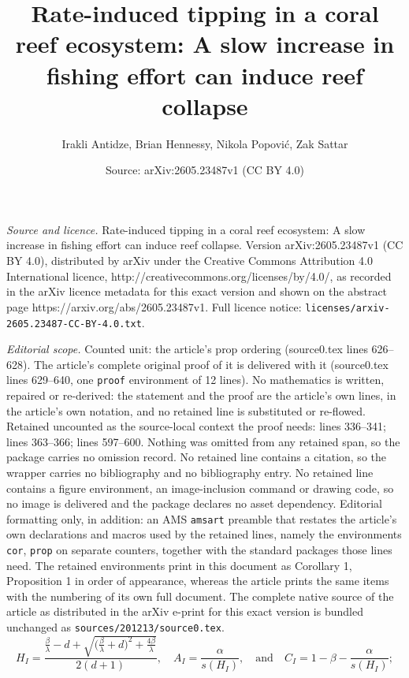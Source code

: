 \documentclass[10pt,a4paper]{amsart}
\title{Rate-induced tipping in a coral reef ecosystem: A slow increase in fishing effort can induce reef collapse}
\author{Irakli Antidze, Brian Hennessy, Nikola Popovi\'c, Zak Sattar}
\date{Source: arXiv:2605.23487v1 (CC BY 4.0)}
\begin{document}
\maketitle

\noindent\emph{Source and licence.} Rate-induced tipping in a coral reef ecosystem: A slow increase in fishing effort can induce reef collapse. Version arXiv:2605.23487v1 (CC BY 4.0), distributed by arXiv under the Creative Commons Attribution 4.0 International licence, http://creativecommons.org/licenses/by/4.0/, as recorded in the arXiv licence metadata for this exact version and shown on the abstract page https://arxiv.org/abs/2605.23487v1. Full licence notice: \texttt{licenses/arxiv-2605.23487-CC-BY-4.0.txt}.\par\smallskip

\noindent\textit{Editorial scope.} Counted unit: the article's prop ordering (source0.tex lines 626--628). The article's complete original proof of it is delivered with it (source0.tex lines 629--640, one \texttt{proof} environment of 12 lines). No mathematics is written, repaired or re-derived: the statement and the proof are the article's own lines, in the article's own notation, and no retained line is substituted or re-flowed.  Retained uncounted as the source-local context the proof needs: lines 336--341; lines 363--366; lines 597--600.  Nothing was omitted from any retained span, so the package carries no omission record.  No retained line contains a citation, so the wrapper carries no bibliography and no bibliography entry.  No retained line contains a figure environment, an image-inclusion command or drawing code, so no image is delivered and the package declares no asset dependency.  Editorial formatting only, in addition: an AMS \texttt{amsart} preamble that restates the article's own declarations and macros used by the retained lines, namely the environments \texttt{cor}, \texttt{prop} on separate counters, together with the standard packages those lines need.  The retained environments print in this document as Corollary 1, Proposition 1 in order of appearance, whereas the article prints the same items with the numbering of its own full document.  The complete native source of the article as distributed in the arXiv e-print for this exact version is bundled unchanged as \texttt{sources/201213/source0.tex}.
\begin{equation}
    H_I = \frac{\frac{\beta}{\lambda}-d+\sqrt{\big(\frac{\beta}{\lambda}+d\big)^2+\frac{4\beta}{\lambda}}}{2(d+1)},\quad
    A_I = \frac{\alpha}{s(H_I)},\quad\text{and}\quad
    C_I = 1-\beta - \frac{\alpha}{s(H_I)};
    \label{eq: coexistence point}
\end{equation}
\end{document}
